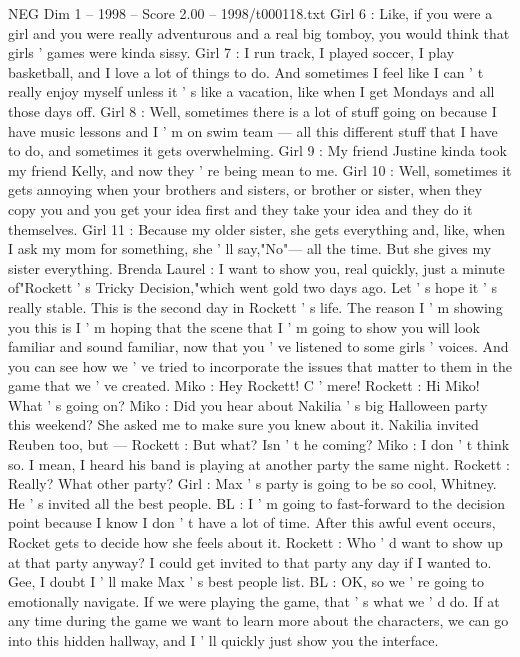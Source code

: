 \begin{textsample}{NEG Dim 1 – 1998 – Score 2.00 – 1998/t000118.txt}
Girl 6 : Like, if you were a girl and you were really adventurous and a real big tomboy, you would think that girls ' games were kinda sissy.
Girl 7 : I run track, I played soccer, I play basketball, and I love a lot of things to do.
And sometimes I feel like I can ' t really enjoy myself unless it ' s like a vacation, like when I get Mondays and all those days off.
Girl 8 : Well, sometimes there is a lot of stuff going on because I have music lessons and I ' m on swim team — all this different stuff that I have to do, and sometimes it gets overwhelming.
Girl 9 : My friend Justine kinda took my friend Kelly, and now they ' re being mean to me.
Girl 10 : Well, sometimes it gets annoying when your brothers and sisters, or brother or sister, when they copy you and you get your idea first and they take your idea and they do it themselves.
Girl 11 : Because my older sister, she gets everything and, like, when I ask my mom for something, she ' ll say,"No"— all the time.
But she gives my sister everything.
Brenda Laurel : I want to show you, real quickly, just a minute of"Rockett ' s Tricky Decision,"which went gold two days ago.
Let ' s hope it ' s really stable.
This is the second day in Rockett ' s life.
The reason I ' m showing you this is I ' m hoping that the scene that I ' m going to show you will look familiar and sound familiar, now that you ' ve listened to some girls ' voices.
And you can see how we ' ve tried to incorporate the issues that matter to them in the game that we ' ve created.
Miko : Hey Rockett!
C ' mere!
Rockett : Hi Miko!
What ' s going on?
Miko : Did you hear about Nakilia ' s big Halloween party this weekend?
She asked me to make sure you knew about it.
Nakilia invited Reuben too, but — Rockett : But what?
Isn ' t he coming?
Miko : I don ' t think so.
I mean, I heard his band is playing at another party the same night.
Rockett : Really?
What other party?
Girl : Max ' s party is going to be so cool, Whitney.
He ' s invited all the best people.
BL : I ' m going to fast-forward to the decision point because I know I don ' t have a lot of time.
After this awful event occurs, Rocket gets to decide how she feels about it.
Rockett : Who ' d want to show up at that party anyway?
I could get invited to that party any day if I wanted to.
Gee, I doubt I ' ll make Max ' s best people list.
BL : OK, so we ' re going to emotionally navigate.
If we were playing the game, that ' s what we ' d do.
If at any time during the game we want to learn more about the characters, we can go into this hidden hallway, and I ' ll quickly just show you the interface.

\end{textsample}
